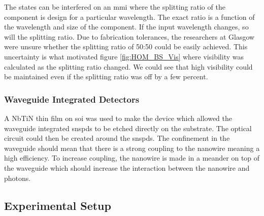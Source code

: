 The states can be interfered on an \ac{mmi} where the splitting ratio of the component is design for a particular wavelength. The exact ratio is a function of the wavelength and size of the component. If the input wavelength changes, so will the splitting ratio. Due to fabrication tolerances, the researchers at Glasgow were unsure whether the splitting ratio of 50:50 could be easily achieved. This uncertainty is what motivated figure \ref{fig:HOM_BS_Vis} where visibility was calculated as the splitting ratio changed. We could see that high visibility could be maintained even if the splitting ratio was off by a few percent.

\subsubsection*{Waveguide Integrated Detectors}

A \ac{NbTiN} thin film on \ac{soi} was used to make the device which allowed the waveguide integrated \acp{snspd} to be etched directly on the substrate. The optical circuit could then be created around the \acp{snspd}. The confinement in the waveguide should mean that there is a strong coupling to the nanowire meaning a high efficiency. To increase coupling, the nanowire is made in a meander on top of the waveguide which should increase the interaction between the nanowire and photons.




%

\subsection{Experimental Setup}

